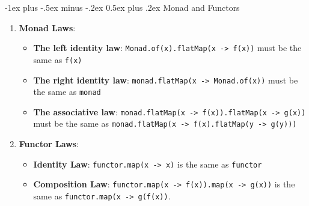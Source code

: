 \documentclass[10pt, landscape]{article}
\makeatletter
\renewcommand{\section}{\@startsection{section}{1}{0mm}%
                                {-1ex plus -.5ex minus -.2ex}%
                                {0.5ex plus .2ex}%
                                {\normalfont\large\bfseries}}
\makeatother
\begin{document}
\begin{multicols}{4}
\section{Monad and Functors}
\begin{enumerate}
    \item \textbf{Monad Laws}:
    \begin{itemize}
        \item \textbf{The left identity law}: \texttt{Monad.of(x).flatMap(x -> f(x))} must be the same as \texttt{f(x)}
        \item \textbf{The right identity law}: \texttt{monad.flatMap(x -> Monad.of(x))} must be the same as \texttt{monad}
        \item \textbf{The associative law}: \texttt{monad.flatMap(x -> f(x)).flatMap(x -> g(x))} must be the same as \texttt{monad.flatMap(x -> f(x).flatMap(y -> g(y)))}
    \end{itemize}
    \item \textbf{Functor Laws}:
    \begin{itemize}
        \item \textbf{Identity Law}: \texttt{functor.map(x -> x)} is the same as \texttt{functor}
        \item \textbf{Composition Law}: \texttt{functor.map(x -> f(x)).map(x -> g(x))} is the same as \texttt{functor.map(x -> g(f(x))}.
    \end{itemize}
\end{enumerate}


\end{multicols}
\end{document}
